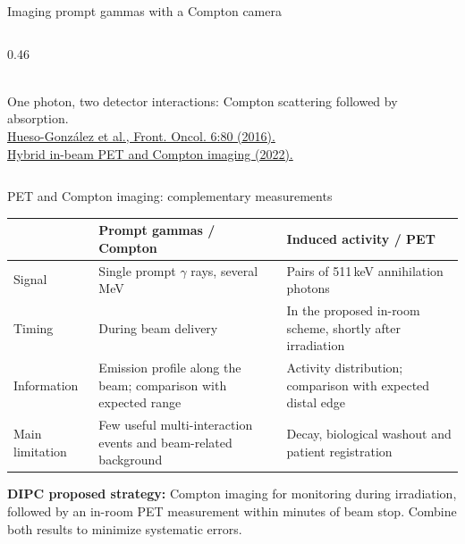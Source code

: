 \documentclass[aspectratio=169,11pt]{beamer}
\begin{document}
\begin{frame}{Imaging prompt gammas with a Compton camera}
\begin{columns}[T]
\begin{column}{0.46\textwidth}
{}\\[2mm]
      {\scriptsize\color{crGrey} One photon, two detector interactions:
       Compton scattering followed by absorption.}\\[3mm]
      {\tiny\color{crGrey}
       \href{https://doi.org/10.3389/fonc.2016.00080}
       {Hueso-Gonz\'alez et al., Front. Oncol. 6:80 (2016).}\\
       \href{https://arxiv.org/abs/2202.06556}
       {Hybrid in-beam PET and Compton imaging (2022).}}
    \end{column}
  \end{columns}
\end{frame}

\begin{frame}{PET and Compton imaging: complementary measurements}
\small
\renewcommand{\arraystretch}{1.22}
\begin{tabular}{@{}>{\raggedright\arraybackslash}p{}>{\raggedright\arraybackslash}p{}>{\raggedright\arraybackslash}p{}@{}}
\toprule
 & \textbf{Prompt gammas / Compton} & \textbf{Induced activity / PET}\\
\midrule
Signal & Single prompt $\gamma$ rays, several MeV & Pairs of 511\,keV annihilation photons\\
Timing & During beam delivery & In the proposed in-room scheme, shortly after irradiation\\
Information & Emission profile along the beam; comparison with expected range & Activity distribution; comparison with expected distal edge\\
Main limitation & Few useful multi-interaction events and beam-related background & Decay, biological washout and patient registration\\
\bottomrule
\end{tabular}
\par\vspace{5mm}
\textbf{DIPC proposed strategy:} Compton imaging for monitoring during irradiation, followed by an in-room PET measurement within minutes of beam stop. Combine both results to minimize systematic errors.
\end{frame}
\end{document}
